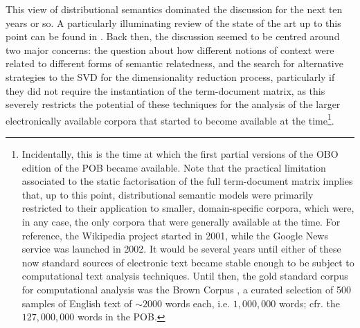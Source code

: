 This view of distributional semantics dominated the discussion for the next ten years or so.
A particularly illuminating review of the state of the art up to this point can be found in \citet{sahlgren2006}.
Back then, the discussion seemed to be centred around two major concerns: the question about how different notions of context were related to different forms of semantic relatedness, and the search for alternative strategies to the SVD for the dimensionality reduction process, particularly if they did not require the instantiation of the term-document matrix, as this severely restricts the potential of these techniques for the analysis of the larger electronically available corpora that started to become available at the time\footnote{
    Incidentally, this is the time at which the first partial versions of the OBO edition of the POB became available.
    Note that the practical limitation associated to the static factorisation of the full term-document matrix implies that, up to this point, distributional semantic models were primarily restricted to their application to smaller, domain-specific corpora, which were, in any case, the only corpora that were generally available at the time.
    For reference, the Wikipedia project started in 2001, while the Google News service was launched in 2002.
    It would be several years until either of these now standard sources of electronic text became stable enough to be subject to computational text analysis techniques.
    Until then, the gold standard corpus for computational analysis was the Brown Corpus \citep{francis1979}, a curated selection of 500 samples of English text of $\sim2000$ words each, i.e. $1,000,000$ words; cfr. the $127,000,000$ words in the POB.
}.

